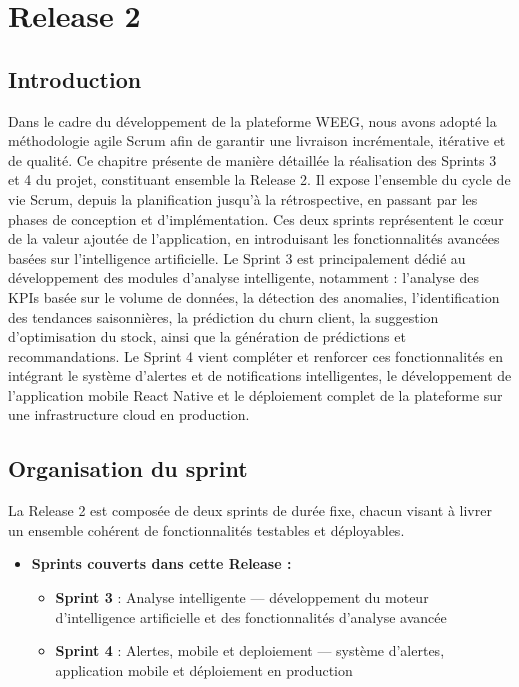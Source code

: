 \documentclass[a4paper,12pt]{report}
\begin{document}

\chapter{Release 2}

\section{Introduction}

Dans le cadre du développement de la plateforme WEEG, nous avons adopté la méthodologie agile Scrum afin de garantir une livraison incrémentale, itérative et de qualité. Ce chapitre présente de manière détaillée la réalisation des Sprints 3 et 4 du projet, constituant ensemble la Release 2. Il expose l'ensemble du cycle de vie Scrum, depuis la planification jusqu'à la rétrospective, en passant par les phases de conception et d'implémentation.
Ces deux sprints représentent le cœur de la valeur ajoutée de l'application, en introduisant les fonctionnalités avancées basées sur l'intelligence artificielle. Le Sprint 3 est principalement dédié au développement des modules d'analyse intelligente, notamment : l'analyse des KPIs basée sur le volume de données, la détection des anomalies, l'identification des tendances saisonnières, la prédiction du churn client, la suggestion d'optimisation du stock, ainsi que la génération de prédictions et recommandations.
Le Sprint 4 vient compléter et renforcer ces fonctionnalités en intégrant le système d'alertes et de notifications intelligentes, le développement de l'application mobile React Native et le déploiement complet de la plateforme sur une infrastructure cloud en production.

\section{Organisation du sprint}

La Release 2 est composée de deux sprints de durée fixe, chacun visant à livrer un ensemble cohérent de fonctionnalités testables et déployables.

\begin{itemize}
    \item \textbf{Sprints couverts dans cette Release :}
    \begin{itemize}
        \item \textbf{Sprint 3} : Analyse intelligente — développement du moteur d'intelligence artificielle et des fonctionnalités d'analyse avancée
        \item \textbf{Sprint 4} : Alertes, mobile et deploiement — système d'alertes, application mobile et déploiement en production
    \end{itemize}
\end{itemize}
\end{document}
